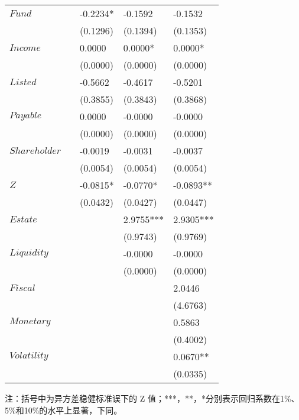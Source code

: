\begin{table}
\begin{center}
\begin{tabular}{lllll}
			\(Fund\)        &            & -0.2234*   & -0.1592     & -0.1532      \\
			                &            & (0.1296)   & (0.1394)    & (0.1353)     \\
			\(Income\)      &            & 0.0000     & 0.0000*     & 0.0000*      \\
			                &            & (0.0000)   & (0.0000)    & (0.0000)     \\
			\(Listed\)      &            & -0.5662    & -0.4617     & -0.5201      \\
			                &            & (0.3855)   & (0.3843)    & (0.3868)     \\
			\(Payable\)     &            & 0.0000     & -0.0000     & -0.0000      \\
			                &            & (0.0000)   & (0.0000)    & (0.0000)     \\
			\(Shareholder\) &            & -0.0019    & -0.0031     & -0.0037      \\
			                &            & (0.0054)   & (0.0054)    & (0.0054)     \\
			\(Z\)           &            & -0.0815*   & -0.0770*    & -0.0893**    \\
			                &            & (0.0432)   & (0.0427)    & (0.0447)     \\
			\(Estate\)      &            &            & 2.9755***   & 2.9305***    \\
			                &            &            & (0.9743)    & (0.9769)     \\
			\(Liquidity\)   &            &            & -0.0000     & -0.0000      \\
			                &            &            & (0.0000)    & (0.0000)     \\
			\(Fiscal\)      &            &            &             & 2.0446       \\
			                &            &            &             & (4.6763)     \\
			\(Monetary\)    &            &            &             & 0.5863       \\
			                &            &            &             & (0.4002)     \\
			\(Volatility\)  &            &            &             & 0.0670**     \\
			                &            &            &             & (0.0335)     \\
			\bottomrule
		\end{tabular}
	\end{center}
    \qquad \small{注：括号中为异方差稳健标准误下的 Z 值；***，**，*分别表示回归系数在1\%、5\%和10\%的水平上显著，下同。}
\end{table}
